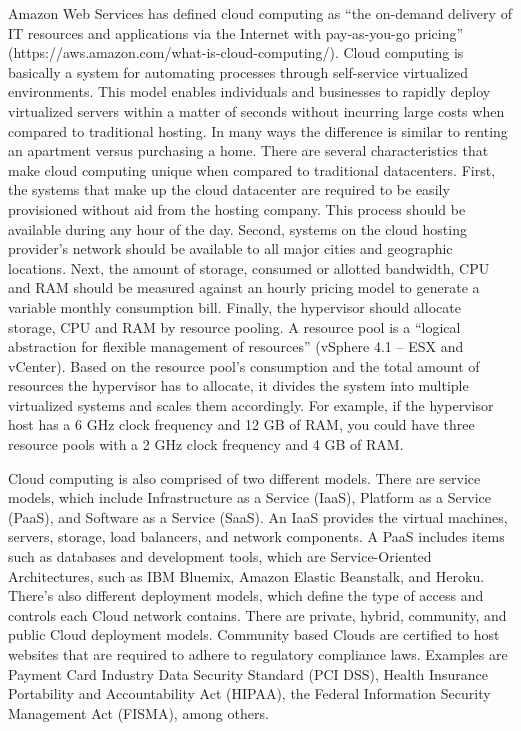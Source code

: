 \documentclass[./main.tex]{subfiles}
\begin{document}
 Amazon Web Services has defined cloud computing as “the on-demand delivery of IT resources and applications via the Internet with pay-as-you-go pricing” (https://aws.amazon.com/what-is-cloud-computing/). Cloud computing is basically a system for automating processes through self-service virtualized environments. This model enables individuals and businesses to rapidly deploy virtualized servers within a matter of seconds without incurring large costs when compared to traditional hosting. In many ways the difference is similar to renting an apartment versus purchasing a home.
There are several characteristics that make cloud computing unique when compared to traditional datacenters. First, the systems that make up the cloud datacenter are required to be easily provisioned without aid from the hosting company. This process should be available during any hour of the day. Second, systems on the cloud hosting provider’s network should be available to all major cities and geographic locations. Next, the amount of storage, consumed or allotted bandwidth, CPU and RAM should be measured against an hourly pricing model to generate a variable monthly consumption bill. Finally, the hypervisor should allocate storage, CPU and RAM by resource pooling. A resource pool is a “logical abstraction for flexible management of resources” (vSphere 4.1 – ESX and vCenter). Based on the resource pool’s consumption and the total amount of resources the hypervisor has to allocate, it divides the system into multiple virtualized systems and scales them accordingly. For example, if the hypervisor host has a 6 GHz clock frequency and 12 GB of RAM, you could have three resource pools with a 2 GHz clock frequency and 4 GB of RAM.

Cloud computing is also comprised of two different models. There are service models, which include Infrastructure as a Service (IaaS), Platform as a Service (PaaS), and Software as a Service (SaaS). An IaaS provides the virtual machines, servers, storage, load balancers, and network components. A PaaS includes items such as databases and development tools, which are Service-Oriented Architectures, such as IBM Bluemix, Amazon Elastic Beanstalk, and Heroku. There’s also different deployment models, which define the type of access and controls each Cloud network contains. There are private, hybrid, community, and public Cloud deployment models. Community based Clouds are certified to host websites that are required to adhere to regulatory compliance laws. Examples are Payment Card Industry Data Security Standard (PCI DSS), Health Insurance Portability and Accountability Act (HIPAA), the Federal Information Security Management Act (FISMA), among others.
\end{document}
